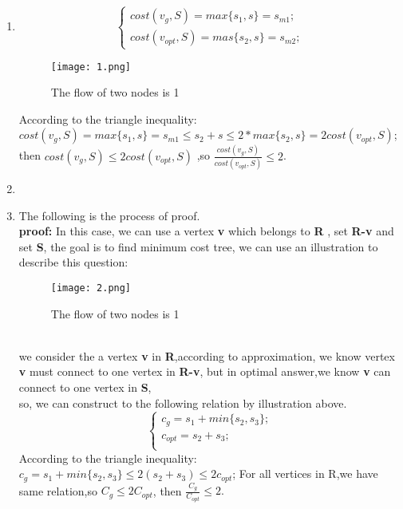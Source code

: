\documentclass[12pt,a4paper]{article}
\makeatletter
\newtheorem*{solution}{Solution}
\theoremstyle{definition}
\renewenvironment{solution}[1][Solution] {\par\pushQED{\qed}\normalfont\topsep6\p@\@plus6\p@\relax\trivlist\item[\hskip\labelsep\bfseries#1\@addpunct{.}]\ignorespaces}{\popQED\endtrivlist\@endpefalse} \makeatother
\makeatother
\begin{document}
\begin{enumerate}
\begin{solution}
\begin{equation*}
\begin{cases}
            cost(v_g,S)=max\{s_1,s\}=s_{m1}; \\
            cost(v_{opt},S)=mas\{s_2,s\}=s_{m2};
            \end{cases}
          \end{equation*}
          \begin{figure}[htbp]
          \begin{minipage}[h]{0.8\textwidth}
          \centering
         \texttt{[image: 1.png]}
         \caption{The flow of two nodes is 1}
         \end{minipage}
          \end{figure}
          According to the triangle inequality: \\
          $cost(v_g,S)=max\{s_1,s\}=s_{m1} \leq s_{2}+s \leq 2* max\{s_{2},s\} =2 cost(v_{opt},S) $; \\ then $cost(v_g,S) \leq 2 cost(v_{opt},S)$ ,so $\frac{cost(v_g,S)}{cost(v_{opt},S)} \leq 2$.\\
        \end{solution}
        \vspace{2cm}

    \item
    \begin{solution}
      The following is the process of proof.\\
      \textbf{proof:} In this case, we can use a vertex \textbf{v} which belongs to \textbf{R} , set \textbf{R-{v}} and set \textbf{S}, the goal is to find minimum cost tree, we can use an illustration to describe this question:\\
      \begin{figure}[htbp]
     \begin{minipage}[h]{0.8\textwidth}
     \centering
     \texttt{[image: 2.png]}
     \caption{The flow of two nodes is 1}
    \end{minipage}
    \end{figure}
    \\
    we consider the a vertex \textbf{v} in \textbf{R},according to approximation, we know vertex \textbf{v} must connect to one vertex in \textbf{R-{v}}, but in optimal answer,we know \textbf{v} can connect to one vertex in \textbf{S}, \\ so, we can construct to the following relation by illustration above.\\
    \begin{equation*}
      \begin{cases}
        c_g=s_1+min\{s_2,s_3\};\\
        c_{opt}=s_2+s_3;\\
      \end{cases}
    \end{equation*}
    According to the triangle inequality: $c_g=s_1+min\{s_2,s_3\} \leq 2(s_2+s_3) \leq 2 c_{opt}$; For all vertices in R,we have same relation,so $C_g \leq 2 C_{opt}$, then $\frac{C_g}{C_{opt}}\leq 2.$\\
    \end{solution}


\end{enumerate}
\end{document}
